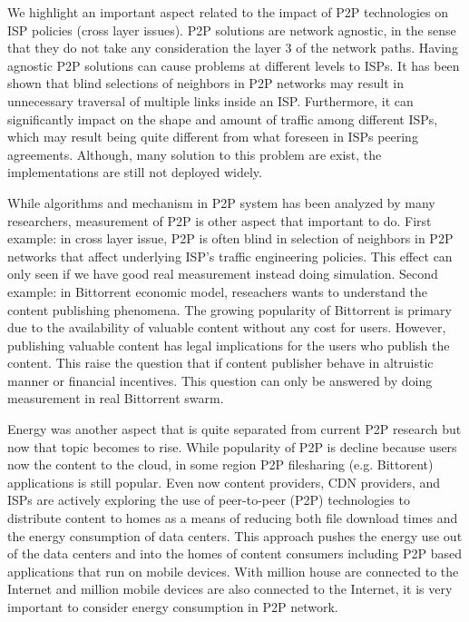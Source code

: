 We highlight an important aspect related to the impact of P2P technologies on ISP policies (cross layer issues). 
P2P solutions are network agnostic, in the sense that they do not take any consideration the layer 3 of the network paths. 
Having agnostic P2P solutions can cause problems at different levels to ISPs. 
It has been shown that blind selections of neighbors in P2P networks may result in unnecessary traversal of multiple links inside an ISP. 
Furthermore, it can significantly impact on the shape and amount of traffic among different ISPs, which may result being quite different from what foreseen in ISPs peering agreements.
Although, many solution to this problem are exist, the implementations are still not deployed widely.  

While algorithms and mechanism in P2P system has been analyzed by many researchers, measurement of P2P is other aspect that important to do. 
First example: in cross layer issue, P2P is often blind in selection of neighbors in P2P networks that affect underlying ISP's traffic engineering policies.  
This effect can only seen if we have good real measurement instead doing simulation.
Second example: in Bittorrent economic model, reseachers wants to understand the content publishing phenomena. 
The growing popularity of Bittorrent is primary due to the availability of valuable content without any cost for users.
However, publishing valuable content has legal implications for the users who publish the content.
This raise the question that if content publisher behave in altruistic manner or financial incentives. 
This question can only be answered by doing measurement in real Bittorrent swarm. 

Energy was another aspect that is quite separated from current P2P research but now that topic becomes to rise. 
While popularity of P2P is decline because users now the content to the cloud, in some region P2P filesharing (e.g. Bittorent) applications is still popular.
Even now content providers, CDN providers, and ISPs are actively exploring the use of peer-to-peer (P2P) technologies to distribute content to homes as a means of reducing both file download times and the energy consumption of data centers. 
This approach pushes the energy use out of the data centers and into the homes of content consumers including P2P based applications that run on mobile devices.
With million house are connected to the Internet and million mobile devices are also connected to the Internet, it is very important to consider energy consumption in P2P network.



